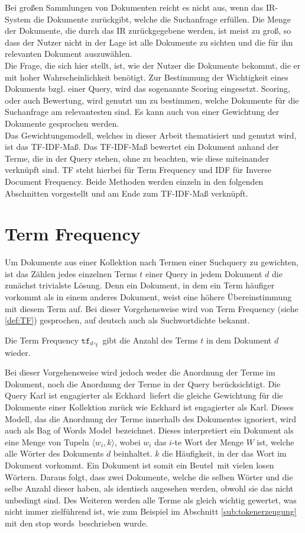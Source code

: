 Bei großen Sammlungen von Dokumenten reicht es nicht aus, wenn das IR-System die Dokumente zurückgibt, welche die Suchanfrage erfüllen. Die Menge der Dokumente, die durch das IR zurückgegebene werden, ist meist zu groß, so dass der Nutzer nicht in der Lage ist alle Dokumente zu sichten und die für ihn relevanten Dokument auszuwählen.\\
Die Frage, die sich hier stellt, ist, wie der Nutzer die Dokumente bekommt, die er mit hoher Wahrscheinlichkeit benötigt. Zur Bestimmung der Wichtigkeit eines Dokuments bzgl. einer Query, wird das sogenannte Scoring eingesetzt. Scoring, oder auch Bewertung, wird genutzt um zu bestimmen, welche Dokumente für die Suchanfrage am relevantesten sind. Es kann auch von einer Gewichtung der Dokumente gesprochen werden.\\
Das Gewichtungsmodell, welches in dieser Arbeit thematisiert und genutzt wird, ist das TF-IDF-Maß. Das TF-IDF-Maß bewertet ein Dokument anhand der Terme, die in der Query stehen, ohne zu beachten, wie diese miteinander verknüpft sind. TF steht hierbei für Term Frequency und IDF für Inverse Document Frequency. Beide Methoden werden einzeln in den folgenden Abschnitten vorgestellt und am Ende zum TF-IDF-Maß verknüpft.

\section{Term Frequency}
Um Dokumente aus einer Kollektion nach Termen einer Suchquery zu gewichten, ist das Zählen jedes einzelnen Terms $t$ einer Query in jedem Dokument $d$ die zunächst trivialste Lösung. Denn ein Dokument, in dem ein Term häufiger vorkommt als in einem anderes Dokument, weist eine höhere Übereinstimmung mit diesem Term auf.\newpage
Bei dieser Vorgehensweise wird von Term Frequency (siehe \cref{def:TF}) gesprochen, auf deutsch auch als Suchwortdichte bekannt.
\begin{defi}\cite[S. 117]{IR_Intro_Cambridge}\label{def:TF}
	Die Term Frequency $\mathtt{tf}_d,_t$ gibt die Anzahl des Terms $t$ in dem Dokument $d$ wieder.
\end{defi}
Bei dieser Vorgehensweise wird jedoch weder die Anordnung der Terme im Dokument, noch die Anordnung der Terme in der Query berücksichtigt. Die Query \glqq Karl ist engagierter als Eckhard\grqq\ liefert die gleiche Gewichtung für die Dokumente einer Kollektion zurück wie \glqq Eckhard ist engagierter als Karl\grqq . Dieses Modell, das die Anordnung der Terme innerhalb des Dokumentes ignoriert, wird auch als \glqq Bag of Words Model\grqq\ bezeichnet. Dieses interpretiert ein Dokument als eine Menge von Tupeln $\langle w_i, k \rangle$, wobei $w_i$ das $i$-te Wort der Menge $W$ ist, welche alle Wörter des Dokuments $d$ beinhaltet. $k$ die Häufigkeit, in der das Wort im Dokument vorkommt. Ein Dokument ist somit ein \glqq Beutel\grqq\ mit vielen losen Wörtern. Daraus folgt, dass zwei Dokumente, welche die selben Wörter und die selbe Anzahl dieser haben, als identisch angesehen werden, obwohl sie das nicht unbedingt sind. Des Weiteren werden alle Terme als gleich wichtig gewertet, was nicht immer zielführend ist, wie zum Beispiel im Abschnitt \ref{sub:tokenerzeugung} mit den \glqq stop words\grqq\ beschrieben wurde.

